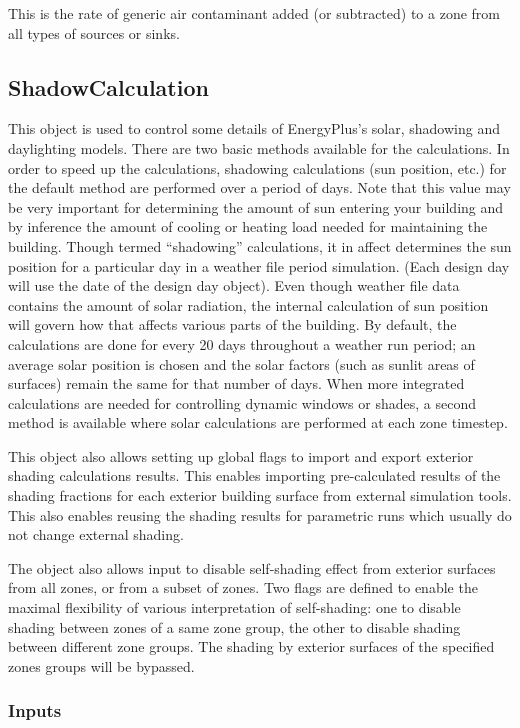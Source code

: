 This is the rate of generic air contaminant added (or subtracted) to a zone from all types of sources or sinks.

\subsection{ShadowCalculation}\label{shadowcalculation}

This object is used to control some details of EnergyPlus's solar, shadowing and daylighting models. There are two basic methods available for the calculations. In order to speed up the calculations, shadowing calculations (sun position, etc.) for the default method are performed over a period of days. Note that this value may be very important for determining the amount of sun entering your building and by inference the amount of cooling or heating load needed for maintaining the building. Though termed ``shadowing'' calculations, it in affect determines the sun position for a particular day in a weather file period simulation. (Each design day will use the date of the design day object). Even though weather file data contains the amount of solar radiation, the internal calculation of sun position will govern how that affects various parts of the building. By default, the calculations are done for every 20 days throughout a weather run period; an average solar position is chosen and the solar factors (such as sunlit areas of surfaces) remain the same for that number of days. When more integrated calculations are needed for controlling dynamic windows or shades, a second method is available where solar calculations are performed at each zone timestep.

This object also allows setting up global flags to import and export exterior shading calculations results. This enables importing pre-calculated results of the shading fractions for each exterior building surface from external simulation tools. This also enables reusing the shading results for parametric runs which usually do not change external shading.

The object also allows input to disable self-shading effect from exterior surfaces from all zones, or from a subset of zones. Two flags are defined to enable the maximal flexibility of various interpretation of self-shading: one to disable shading between zones of a same zone group, the other to disable shading between different zone groups. The shading by exterior surfaces of the specified zones groups will be bypassed.

\subsubsection{Inputs}\label{inputs-10-019}

